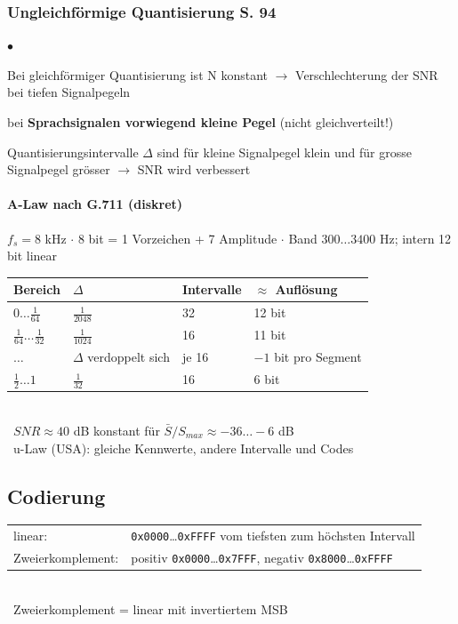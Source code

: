 \subsubsection{Ungleichförmige Quantisierung S. 94}
	\begin{list}{$\bullet$}{\setlength{\itemsep}{0cm} \setlength{\parsep}{0cm}
		\setlength{\topsep}{0cm}} 
		\item Bei gleichförmiger Quantisierung ist N konstant $\rightarrow$ Verschlechterung der SNR bei tiefen Signalpegeln
		\item bei \textbf{Sprachsignalen vorwiegend kleine Pegel} (nicht gleichverteilt!)
		\item Quantisierungsintervalle $\Delta$ sind für kleine Signalpegel klein und für grosse Signalpegel grösser $\rightarrow$ SNR wird verbessert
	\end{list}

\paragraph{A-Law nach G.711 (diskret)}
$f_s = 8$ kHz $\cdot$ 8 bit = 1 Vorzeichen + 7 Amplitude $\cdot$ Band $300\ldots3400$ Hz; intern 12 bit linear\\
{\renewcommand{\arraystretch}{1.5}
\begin{tabular}{l l l l}
	\textbf{Bereich} & \textbf{$\Delta$} & \textbf{Intervalle} & \textbf{$\approx$ Auflösung} \\ \hline
	$0 \ldots \tfrac{1}{64}$ & $\tfrac{1}{2048}$ & 32 & 12 bit \\
	$\tfrac{1}{64} \ldots \tfrac{1}{32}$ & $\tfrac{1}{1024}$ & 16 & 11 bit \\
	$\ldots$ & $\Delta$ verdoppelt sich & je 16 & $-1$ bit pro Segment \\
	$\tfrac{1}{2} \ldots 1$ & $\tfrac{1}{32}$ & 16 & 6 bit \\
\end{tabular}}\\
{\small \textrightarrow\ $SNR \approx 40$ dB konstant für $\bar{S}/S_{max} \approx -36\ldots-6$ dB}\\
{\small \textrightarrow\ u-Law (USA): gleiche Kennwerte, andere Intervalle und Codes}

\subsection{Codierung}
{\renewcommand{\arraystretch}{1.4}
\begin{tabular}{l l}
	linear: & \texttt{0x0000}\ldots\texttt{0xFFFF} vom tiefsten zum höchsten Intervall \\
	Zweierkomplement: & positiv \texttt{0x0000}\ldots\texttt{0x7FFF}, negativ \texttt{0x8000}\ldots\texttt{0xFFFF} \\
\end{tabular}}\\
{\small \textrightarrow\ Zweierkomplement = linear mit invertiertem MSB}
\vfill


